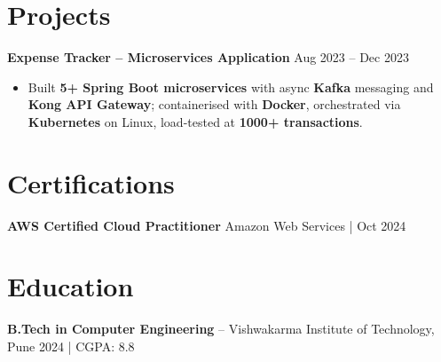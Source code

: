 \documentclass[letterpaper,10pt]{article}
\begin{document}
\section*{Projects}

\textbf{Expense Tracker -- Microservices Application} \hfill Aug 2023 -- Dec 2023
\begin{itemize}[leftmargin=*]
    \item Built \textbf{5+ Spring Boot microservices} with async \textbf{Kafka} messaging and \textbf{Kong API Gateway}; containerised with \textbf{Docker}, orchestrated via \textbf{Kubernetes} on Linux, load-tested at \textbf{1000+ transactions}.
\end{itemize}

\section*{Certifications}
\textbf{AWS Certified Cloud Practitioner} \hfill Amazon Web Services \;|\; Oct 2024

\section*{Education}
\textbf{B.Tech in Computer Engineering} -- Vishwakarma Institute of Technology, Pune \hfill 2024 \;|\; CGPA: 8.8
\end{document}

